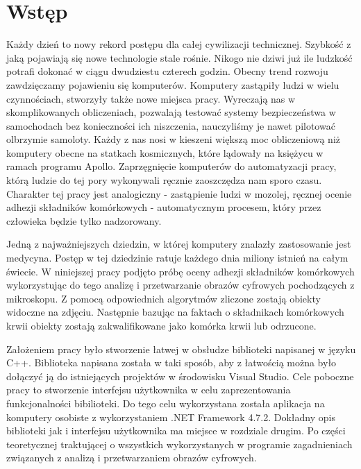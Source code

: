 \documentclass{article}
\begin{document}
    \section{Wstęp}
    {
        \Large
        \justifying
        \quad 
        Każdy dzień to nowy rekord postępu dla całej cywilizacji technicznej.
        Szybkość z jaką pojawiają się nowe technologie stale rośnie.
        Nikogo nie dziwi już ile ludzkość potrafi dokonać w ciągu dwudziestu czterech godzin.
        Obecny trend rozwoju zawdzięczamy pojawieniu się komputerów.
        Komputery zastąpiły ludzi w wielu czynnościach, stworzyły także nowe miejsca pracy.
        Wyreczają nas w skomplikowanych obliczeniach, pozwalają testować systemy bezpieczeństwa w samochodach bez konieczności ich niszczenia, nauczyliśmy je nawet pilotować olbrzymie samoloty.
        Każdy z nas nosi w kieszeni większą moc obliczeniową niż komputery obecne na statkach kosmicznych, które lądowały na księżycu w ramach programu Apollo.
        Zaprzęgnięcie komputerów do automatyzacji pracy, którą ludzie do tej pory wykonywali ręcznie zaoszczędza nam sporo czasu.
        Charakter tej pracy jest analogiczny - zastąpienie ludzi w mozolej, ręcznej ocenie adhezji składników komórkowych -
        automatycznym procesem, który przez człowieka będzie tylko nadzorowany.
    }
    
    \vspace{1cm}
    {
        \Large
        \justifying
        Jedną z najważniejszych dziedzin, w której komputery znalazły zastosowanie jest medycyna.
        Postęp w tej dziedzinie ratuje każdego dnia miliony istnień na całym świecie.
        W niniejszej pracy podjęto próbę oceny adhezji składników komórkowych wykorzystując do tego analizę i przetwarzanie obrazów cyfrowych pochodzących z mikroskopu.
        Z pomocą odpowiednich algorytmów zliczone zostają obiekty widoczne na zdjęciu.
        Następnie bazując na faktach o składnikach komórkowych krwii obiekty zostają zakwalifikowane jako komórka krwii lub odrzucone.
    }

    \vspace{1cm}
    {
        \Large
        \justifying
        Założeniem pracy było stworzenie łatwej w obsłudze biblioteki napisanej w języku C++.
        Biblioteka napisana została w taki sposób, aby z łatwością można było dołączyć ją do istniejących projektów w środowisku Visual Studio.
        Cele poboczne pracy to stworzenie interfejsu użytkownika w celu zaprezentowania funkcjonalności bibilioteki.
        Do tego celu wykorzystana została aplikacja na komputery osobiste z wykorzystaniem .NET Framework 4.7.2.
        Dokładny opis biblioteki jak i interfejsu użytkownika ma miejsce w rozdziale drugim.
        Po części teoretycznej traktującej o wszystkich wykorzystanych w programie zagadnieniach związanych z analizą i przetwarzaniem obrazów cyfrowych. 
    }
\end{document}
